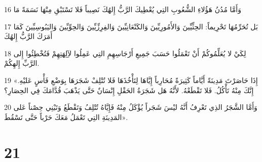 \par 16 وَأَمَّا مُدُنُ هَؤُلاءِ الشُّعُوبِ التِي يُعْطِيكَ الرَّبُّ إِلهُكَ نَصِيباً فَلا تَسْتَبْقِ مِنْهَا نَسَمَةً مَا
\par 17 بَل تُحَرِّمُهَا تَحْرِيماً: الحِثِّيِّينَ وَالأَمُورِيِّينَ وَالكَنْعَانِيِّينَ وَالفِرِزِّيِّينَ وَالحِوِّيِّينَ وَاليَبُوسِيِّينَ كَمَا أَمَرَكَ الرَّبُّ إِلهُكَ
\par 18 لِكَيْ لا يُعَلِّمُوكُمْ أَنْ تَعْمَلُوا حَسَبَ جَمِيعِ أَرْجَاسِهِمِ التِي عَمِلُوا لآِلِهَتِهِمْ فَتُخْطِئُوا إِلى الرَّبِّ إِلهِكُمْ.
\par 19 «إِذَا حَاصَرْتَ مَدِينَةً أَيَّاماً كَثِيرَةً مُحَارِباً إِيَّاهَا لِتَأْخُذَهَا فَلا تُتْلِفْ شَجَرَهَا بِوَضْعِ فَأْسٍ عَليْهِ. إِنَّكَ مِنْهُ تَأْكُلُ. فَلا تَقْطَعْهُ. لأَنَّهُ هَل شَجَرَةُ الحَقْلِ إِنْسَانٌ حَتَّى يَذْهَبَ قُدَّامَكَ فِي الحِصَارِ؟
\par 20 وَأَمَّا الشَّجَرُ الذِي تَعْرِفُ أَنَّهُ ليْسَ شَجَراً يُؤْكَلُ مِنْهُ فَإِيَّاهُ تُتْلِفُ وَتَقْطَعُ وَتَبْنِي حِصْناً عَلى المَدِينَةِ التِي تَعْمَلُ مَعَكَ حَرْباً حَتَّى تَسْقُطَ».

\chapter{21}

